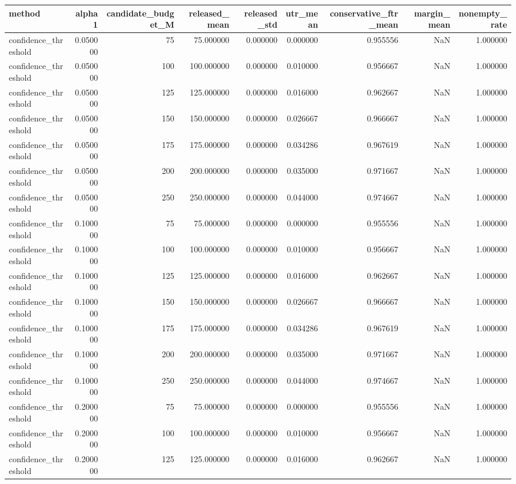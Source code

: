 \begin{tabular}{lrrrrrrrr}
\toprule
method & alpha1 & candidate_budget_M & released_mean & released_std & utr_mean & conservative_ftr_mean & margin_mean & nonempty_rate \\
\midrule
confidence_threshold & 0.050000 & 75 & 75.000000 & 0.000000 & 0.000000 & 0.955556 & NaN & 1.000000 \\
confidence_threshold & 0.050000 & 100 & 100.000000 & 0.000000 & 0.010000 & 0.956667 & NaN & 1.000000 \\
confidence_threshold & 0.050000 & 125 & 125.000000 & 0.000000 & 0.016000 & 0.962667 & NaN & 1.000000 \\
confidence_threshold & 0.050000 & 150 & 150.000000 & 0.000000 & 0.026667 & 0.966667 & NaN & 1.000000 \\
confidence_threshold & 0.050000 & 175 & 175.000000 & 0.000000 & 0.034286 & 0.967619 & NaN & 1.000000 \\
confidence_threshold & 0.050000 & 200 & 200.000000 & 0.000000 & 0.035000 & 0.971667 & NaN & 1.000000 \\
confidence_threshold & 0.050000 & 250 & 250.000000 & 0.000000 & 0.044000 & 0.974667 & NaN & 1.000000 \\
confidence_threshold & 0.100000 & 75 & 75.000000 & 0.000000 & 0.000000 & 0.955556 & NaN & 1.000000 \\
confidence_threshold & 0.100000 & 100 & 100.000000 & 0.000000 & 0.010000 & 0.956667 & NaN & 1.000000 \\
confidence_threshold & 0.100000 & 125 & 125.000000 & 0.000000 & 0.016000 & 0.962667 & NaN & 1.000000 \\
confidence_threshold & 0.100000 & 150 & 150.000000 & 0.000000 & 0.026667 & 0.966667 & NaN & 1.000000 \\
confidence_threshold & 0.100000 & 175 & 175.000000 & 0.000000 & 0.034286 & 0.967619 & NaN & 1.000000 \\
confidence_threshold & 0.100000 & 200 & 200.000000 & 0.000000 & 0.035000 & 0.971667 & NaN & 1.000000 \\
confidence_threshold & 0.100000 & 250 & 250.000000 & 0.000000 & 0.044000 & 0.974667 & NaN & 1.000000 \\
confidence_threshold & 0.200000 & 75 & 75.000000 & 0.000000 & 0.000000 & 0.955556 & NaN & 1.000000 \\
confidence_threshold & 0.200000 & 100 & 100.000000 & 0.000000 & 0.010000 & 0.956667 & NaN & 1.000000 \\
confidence_threshold & 0.200000 & 125 & 125.000000 & 0.000000 & 0.016000 & 0.962667 & NaN & 1.000000 \\

\end{tabular}
